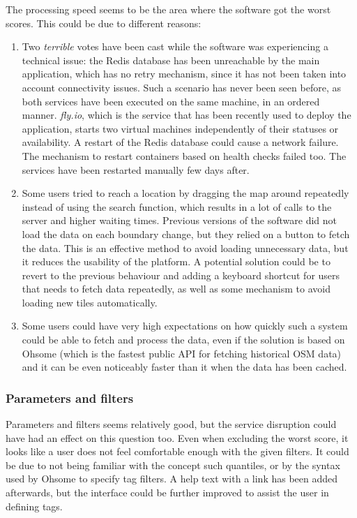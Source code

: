 \documentclass{Configuration_Files/PoliMi3i_thesis}
\begin{document}
The processing speed seems to be the area where the software got the worst scores. This could be due to different reasons:

\begin{enumerate}
\item Two \textit{terrible} votes have been cast while the software was experiencing a technical issue: the Redis database has been unreachable by the main application, which has no retry mechanism, since it has not been taken into account connectivity issues. Such a scenario has never been seen before, as both services have been executed on the same machine, in an ordered manner. \textit{fly.io}, which is the service that has been recently used to deploy the application, starts two virtual machines independently of their statuses or availability. A restart of the Redis database could cause a network failure. The mechanism to restart containers based on health checks failed too. The services have been restarted manually few days after.
\item Some users tried to reach a location by dragging the map around repeatedly instead of using the search function, which results in a lot of calls to the server and higher waiting times. Previous versions of the software did not load the data on each boundary change, but they relied on a button to fetch the data. This is an effective method to avoid loading unnecessary data, but it reduces the usability of the platform. A potential solution could be to revert to the previous behaviour and adding a keyboard shortcut for users that needs to fetch data repeatedly, as well as some mechanism to avoid loading new tiles automatically.
\item Some users could have very high expectations on how quickly such a system could be able to fetch and process the data, even if the solution is based on Ohsome (which is the fastest public API for fetching historical OSM data) and it can be even noticeably faster than it when the data has been cached.
\end{enumerate}

\subsubsection{Parameters and filters}

Parameters and filters seems relatively good, but the service disruption could have had an effect on this question too. Even when excluding the worst score, it looks like a user does not feel comfortable enough with the given filters. It could be due to not being familiar with the concept such quantiles, or by the syntax used by Ohsome to specify tag filters. A help text with a link has been added afterwards, but the interface could be further improved to assist the user in defining tags.
\end{document}
